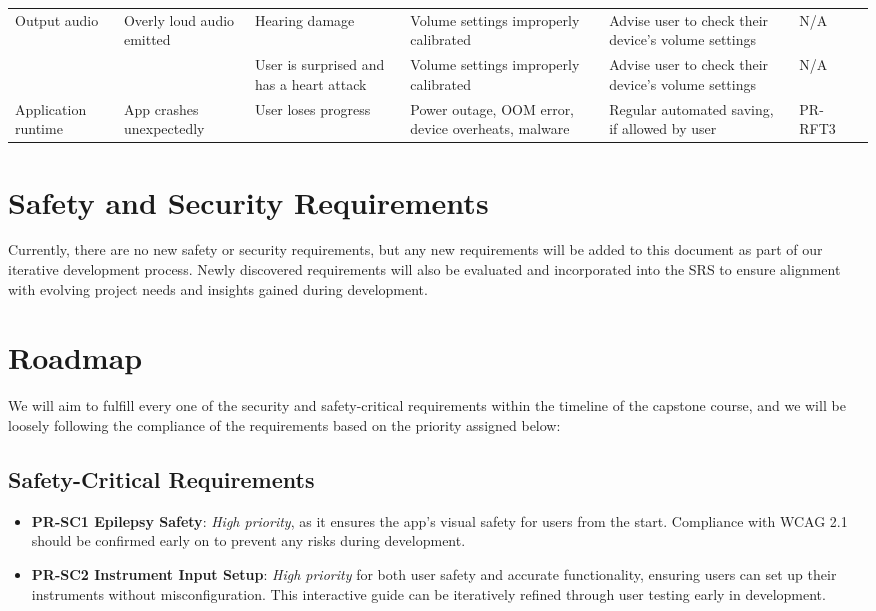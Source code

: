 \documentclass{article}
\begin{document}
\begin{longtable}{|>{\raggedright}p{2cm}|>{\raggedright}p{2.5cm}|>{\raggedright}p{2.5cm}|>{\raggedright}p{2.5cm}|>{\raggedright}p{2.5cm}|p{1.5cm}|p{1.5cm}|}
  \hline
    Output \newline audio & Overly loud audio emitted & Hearing damage & Volume settings improperly calibrated & Advise user to check their device's volume settings & N/A & \\
  \cline{3-7}
    & & User is surprised and has a heart attack & Volume settings improperly calibrated & Advise user to check their device's volume settings & N/A & \\ 
  \hline
    Application runtime & App crashes unexpectedly & User loses progress & Power outage, OOM error, device overheats, malware & Regular automated saving, if allowed by user & PR-RFT3 & \\
  \hline
\end{longtable}

\section{Safety and Security Requirements}

Currently, there are no new safety or security requirements, but any new requirements will be added to this document as part of our iterative development process. Newly discovered requirements will also be evaluated and incorporated into the SRS to ensure alignment with evolving project needs and insights gained during development.


\section{Roadmap}

We will aim to fulfill every one of the security and safety-critical requirements within the timeline of the capstone course, and we will be loosely following the compliance of the requirements based on the priority assigned below:

\subsection{Safety-Critical Requirements}
\begin{itemize}
    \item \textbf{PR-SC1 Epilepsy Safety}: \textit{High priority}, as it ensures the app’s visual safety for users from the start. Compliance with WCAG 2.1 should be confirmed early on to prevent any risks during development.
    \item \textbf{PR-SC2 Instrument Input Setup}: \textit{High priority} for both user safety and accurate functionality, ensuring users can set up their instruments without misconfiguration. This interactive guide can be iteratively refined through user testing early in development.
\end{itemize}
\end{document}

